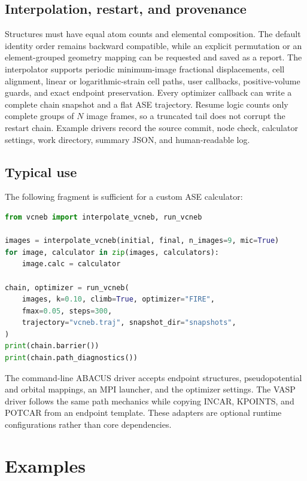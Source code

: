 \documentclass[final,3p,times]{elsarticle}
\begin{document}
\subsection{Interpolation, restart, and provenance}

Structures must have equal atom counts and elemental composition.  The default
identity order remains backward compatible, while an explicit permutation or
an element-grouped geometry mapping can be requested and saved as a report.
The interpolator supports periodic minimum-image fractional displacements,
cell alignment, linear or logarithmic-strain cell paths, user callbacks,
positive-volume guards, and exact endpoint preservation.  Every
optimizer callback can write a complete chain snapshot and a flat ASE
trajectory.  Resume logic counts only complete groups of $N$ image frames, so
a truncated tail does not corrupt the restart chain.  Example drivers record
the source commit, node check, calculator settings, work directory, summary
JSON, and human-readable log.

\subsection{Typical use}

The following fragment is sufficient for a custom ASE calculator:
\begin{lstlisting}[language=Python]
from vcneb import interpolate_vcneb, run_vcneb

images = interpolate_vcneb(initial, final, n_images=9, mic=True)
for image, calculator in zip(images, calculators):
    image.calc = calculator

chain, optimizer = run_vcneb(
    images, k=0.10, climb=True, optimizer="FIRE",
    fmax=0.05, steps=300,
    trajectory="vcneb.traj", snapshot_dir="snapshots",
)
print(chain.barrier())
print(chain.path_diagnostics())
\end{lstlisting}

The command-line ABACUS driver accepts endpoint structures, pseudopotential
and orbital mappings, an MPI launcher, and the optimizer settings.  The VASP
driver follows the same path mechanics while copying INCAR, KPOINTS, and
POTCAR from an endpoint template.  These adapters are optional runtime
configurations rather than core dependencies.

\section{Examples}
\label{sec:examples}
\end{document}
